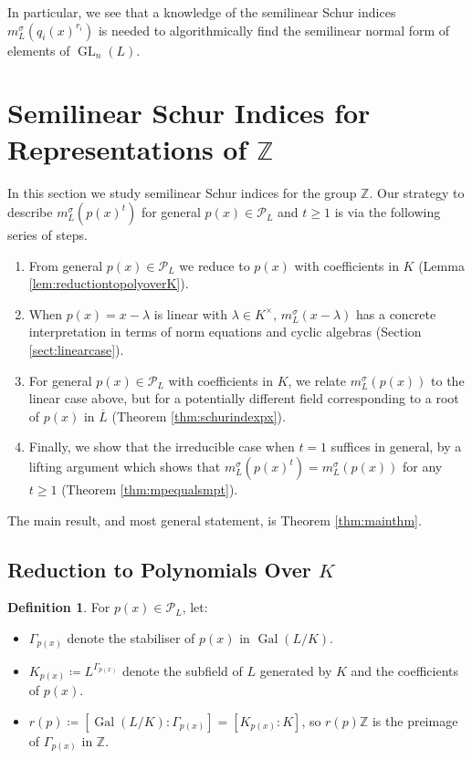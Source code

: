 \documentclass[10pt, reqno, hidelinks]{amsart}
\DeclareMathOperator{\Gal}{Gal}
\DeclareMathOperator{\GL}{GL}
\newcommand{\bZ}{{\mathbb Z}}
\newcommand{\sP}{{\mathcal P}}
\numberwithin{thm}{subsection}
\theoremstyle{definition}
\newtheorem{defn}[thm]{Definition}
\begin{document}
In particular, we see that a knowledge of the semilinear Schur indices $m^{\sigma}_L(q_i(x)^{r_i})$ is needed to algorithmically find the semilinear normal form of elements of $\GL_n(L)$.

\section{Semilinear Schur Indices for Representations of $\bZ$}\label{sect:schurindicesresults}

In this section we study semilinear Schur indices for the group $\bZ$. Our strategy to describe $m_L^{\sigma}(p(x)^t)$ for general $p(x) \in \sP_L$ and $t \geq 1$ is via the following series of steps.
\begin{enumerate}
	\item From general $p(x) \in \sP_L$ we reduce to $p(x)$ with coefficients in $K$ (Lemma \ref{lem:reductiontopolyoverK}).
	\item When $p(x) = x - \lambda$ is linear with $\lambda \in K^{\times}$, $m_L^{\sigma}(x - \lambda)$ has a concrete interpretation in terms of norm equations and cyclic algebras (Section \ref{sect:linearcase}).
	\item For general $p(x) \in \sP_L$ with coefficients in $K$, we relate $m_L^{\sigma}(p(x))$ to the linear case above, but for a potentially different field corresponding to a root of $p(x)$ in $\overline{L}$ (Theorem \ref{thm:schurindexpx}).
	\item Finally, we show that the irreducible case when $t = 1$ suffices in general, by a lifting argument which shows that $m_L^{\sigma}(p(x)^t) = m_L^{\sigma}(p(x))$ for any $t \geq 1$ (Theorem \ref{thm:mpequalsmpt}).
\end{enumerate}

The main result, and most general statement, is Theorem \ref{thm:mainthm}.

\subsection{Reduction to Polynomials Over $K$}

\begin{defn}
	For $p(x) \in \sP_L$, let:
\begin{itemize}
		\item $\Gamma_{p(x)}$ denote the stabiliser of $p(x)$ in $\Gal(L/K)$.
		\item $K_{p(x)} \coloneqq L^{\Gamma_{p(x)}}$ denote the subfield of $L$ generated by $K$ and the coefficients of $p(x)$.
		\item $r(p) \coloneqq [\Gal(L/K) : \Gamma_{p(x)}] = [K_{p(x)} : K]$, so $r(p) \bZ$ is the preimage of $\Gamma_{p(x)}$ in $\bZ$.
	\end{itemize}
\end{defn}
\end{document}
